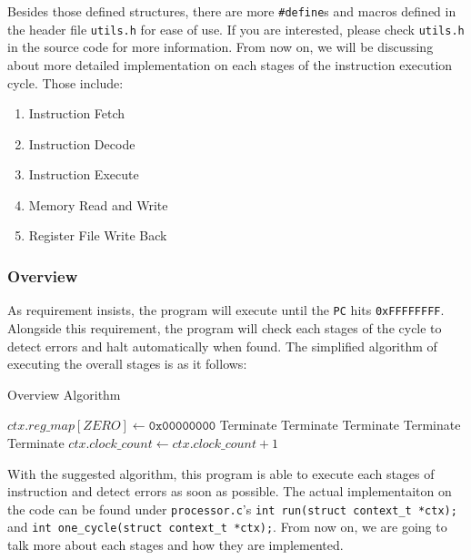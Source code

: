 \documentclass{homework}
\begin{document}
Besides those defined structures, there are more \texttt{\#define}s and macros defined in the header file \texttt{utils.h} for ease of use. If you are interested, please check \texttt{utils.h} in the source code for more information. From now on, we will be discussing about more detailed implementation on each stages of the instruction execution cycle. Those include:

\begin{enumerate}
    \item Instruction Fetch
    \item Instruction Decode
    \item Instruction Execute
    \item Memory Read and Write
    \item Register File Write Back
\end{enumerate}

\pagebreak
\subsubsection{Overview}
As requirement insists, the program will execute until the \texttt{PC} hits \texttt{0xFFFFFFFF}. Alongside this requirement, the program will check each stages of the cycle to detect errors and halt automatically when found. The simplified algorithm of executing the overall stages is as it follows:
\begin{algorithm}
\caption{Overview Algorithm}\label{alg:cap}
\begin{algorithmic}
        \State $ctx.reg\_map[ZERO] \gets \texttt{0x00000000}$ 
         
            \State Terminate
        \EndIf
         
            \State Terminate
        \EndIf
         
            \State Terminate
        \EndIf
         
            \State Terminate
        \EndIf 
         
            \State Terminate
        \EndIf
    \State $ctx.clock\_count \gets ctx.clock\_count + 1$
    \EndWhile
\end{algorithmic}
\end{algorithm}
With the suggested algorithm, this program is able to execute each stages of instruction and detect errors as soon as possible. The actual implementaiton on the code can be found under \texttt{processor.c}'s \texttt{int run(struct context_t *ctx);} and \texttt{int one_cycle(struct context_t *ctx);}. From now on, we are going to talk more about each stages and how they are implemented. 
\end{document}

